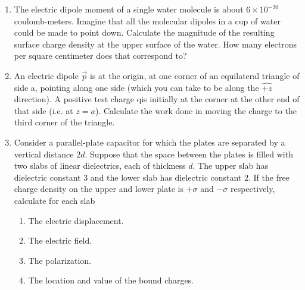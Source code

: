 \documentclass[fleqn]{article}
\begin{document}
  \begin{enumerate}
    \item The electric dipole moment of a single water molecule is about $6 \times 10^{-30}$ coulomb-meters. Imagine that all
    the molecular dipoles in a cup of water could be made to point down. Calculate the magnitude of the resulting surface charge 
    density at the upper surface of the water. How many electrons per square centimeter does that correspond to?


    \item An electric dipole $\overrightarrow{p}$ is at the origin, at one corner of an equilateral triangle of side a, pointing 
    along one side (which you can take to be along the $\hat{+z}$ direction). A positive test charge qis initially at the corner at 
    the other end of that side (i.e. at $z=a$). Calculate the work done in moving the charge to the third corner of the triangle.


    \item Consider a parallel-plate capacitor for which the plates are separated by a vertical distance $2d$. Suppose that the 
    space between the plates is filled with two slabs of linear dielectrics, each of thickness $d$. The upper slab has dielectric 
    constant $3$ and the lower slab has dielectric constant $2$. If the free charge density on the upper and lower plate is
    $+\sigma$ and $-\sigma$ respectively, calculate for each slab
    \begin{enumerate}
      \item The electric displacement.


      \item The electric field.


      \item The polarization.


      \item The location and value of the bound charges.


\end{enumerate}
\end{enumerate}
\end{document}
